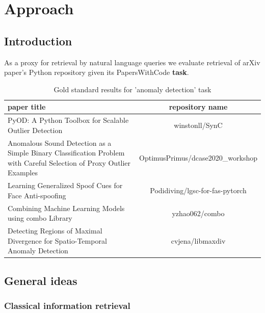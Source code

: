 \documentclass[11pt]{report}
\begin{document}
\chapter{Approach}

\section{Introduction}

As a proxy for retrieval by natural language queries we  evaluate retrieval of arXiv paper's Python repository given its PapersWithCode \textbf{task}.


\begin{table}[hbt!]
\caption{Gold standard results for 'anomaly detection' task}
\begin{tabular}{|p{6cm}|c|}
\hline                                                                                                                paper title &                                repository name\\ \hline
\midrule
                                                                PyOD: A Python Toolbox for Scalable Outlier Detection &                      winstonll/SynC \\ \hline
 Anomalous Sound Detection as a Simple Binary Classification Problem with Careful Selection of Proxy Outlier Examples &    OptimusPrimus/dcase2020\_workshop \\ \hline
                                                               Learning Generalized Spoof Cues for Face Anti-spoofing &     Podidiving/lgsc-for-fas-pytorch \\ \hline
                                                                Combining Machine Learning Models using combo Library &                      yzhao062/combo \\ \hline
                                        Detecting Regions of Maximal Divergence for Spatio-Temporal Anomaly Detection &                    cvjena/libmaxdiv \\ \hline
\end{tabular}
\end{table}

\newpage 

\section{General ideas}
\subsection{Classical information retrieval}
\end{document}
